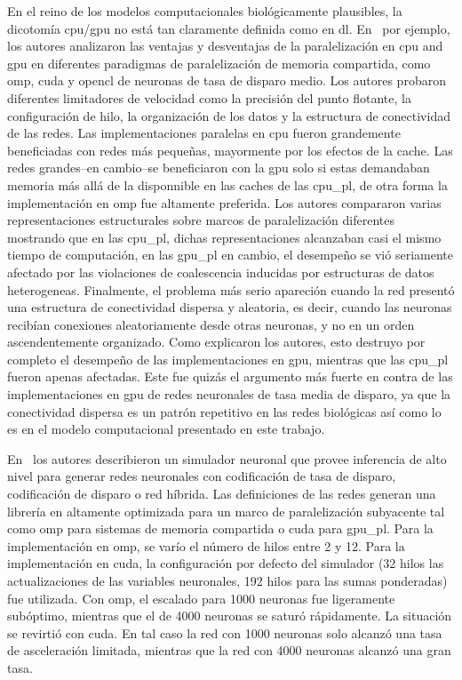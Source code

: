 {En el reino de los modelos computacionales biológicamente plausibles, la dicotomía \gls{cpu}/\gls{gpu} no está tan claramente definida como en \gls{dl}.
En~\cite{doi:10.3109/0954898X.2012.739292} por ejemplo, los autores analizaron las ventajas y desventajas de la paralelización en \gls{cpu} and \gls{gpu} en diferentes paradigmas de paralelización de memoria compartida, como \gls{omp}, \gls{cuda} y \gls{opencl} de neuronas de tasa de disparo medio.
Los autores probaron diferentes limitadores de velocidad como la precisión del punto flotante, la configuración de hilo, la organización de los datos y la estructura de conectividad de las redes.
Las implementaciones paralelas en \gls{cpu} fueron grandemente beneficiadas con redes más pequeñas, mayormente por los efectos de la cache.
Las redes grandes--en cambio--se beneficiaron con la \gls{gpu} solo si estas demandaban memoria más allá de la disponnible en las caches de las \gls{cpu_pl}, de otra forma la implementación en \gls{omp} fue altamente preferida.
Los autores compararon varias representaciones estructurales sobre marcos de paralelización diferentes mostrando que en las \gls{cpu_pl}, dichas representaciones alcanzaban casi el mismo tiempo de computación, en las \gls{gpu_pl} en cambio, el desempeño se vió seriamente afectado por las violaciones de coalescencia inducidas por estructuras de datos heterogeneas.
Finalmente, el problema más serio apareción cuando la red presentó una estructura de conectividad dispersa y aleatoria, es decir, cuando las neuronas recibían conexiones aleatoriamente desde otras neuronas, y no en un orden ascendentemente organizado.
Como explicaron los autores, esto destruyo por completo el desempeño de las implementaciones en \gls{gpu}, mientras que las \gls{cpu_pl} fueron apenas afectadas.
Este fue quizás el argumento más fuerte en contra de las implementaciones en \gls{gpu} de redes neuronales de tasa media de disparo, ya que la conectividad dispersa es un patrón repetitivo en las redes biológicas así como lo es en el modelo computacional presentado en este trabajo.

En~\cite{10.3389/fninf.2015.00019} los autores describieron un simulador neuronal que provee inferencia de alto nivel para generar redes neuronales con codificación de tasa de disparo, codificación de disparo o red híbrida.
Las definiciones de las redes generan una librería en \CC altamente optimizada para un marco de paralelización subyacente tal como \gls{omp} para sistemas de memoria compartida o \gls{cuda} para \gls{gpu_pl}.
Para la implementación en \gls{omp}, se varío el número de hilos entre 2 y 12.
Para la implementación en \gls{cuda}, la configuración por defecto del simulador (32 hilos las actualizaciones de las variables neuronales, 192 hilos para las sumas ponderadas) fue utilizada.
Con \gls{omp}, el escalado para 1000 neuronas fue ligeramente subóptimo, mientras que el de 4000 neuronas se saturó rápidamente.
La situación se revirtió con \gls{cuda}.
En tal caso la red con 1000 neuronas solo alcanzó una tasa de asceleración limitada, mientras que la red con 4000 neuronas alcanzó una gran tasa.

}
